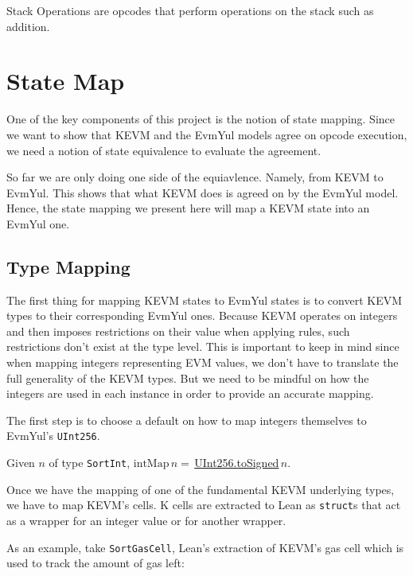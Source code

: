 Stack Operations are opcodes that perform operations on the stack such as addition.



\chapter{State Map}\label{chap:statemap}

One of the key components of this project is the notion of state mapping. Since
we want to show that KEVM and the EvmYul models agree on opcode execution, we
need a notion of state equivalence to evaluate the agreement.

So far we are only doing one side of the equiavlence. Namely, from KEVM to
EvmYul. This shows that what KEVM does is agreed on by the EvmYul model. Hence,
the state mapping we present here will map a KEVM state into an EvmYul one.

\section{Type Mapping}

The first thing for mapping KEVM states to EvmYul states is to convert KEVM
types to their corresponding EvmYul ones.
Because KEVM operates on integers and then imposes restrictions on their value
when applying rules, such restrictions don't exist at the type level. This is
important to keep in mind since when mapping integers representing EVM values,
we don't have to translate the full generality of the KEVM types. But we need to
be mindful on how the integers are used in each instance in order to provide an
accurate mapping.

The first step is to choose a default on how to map integers themselves to
EvmYul's \texttt{UInt256}.

\begin{definition}[intMap]\leanok\label{def:intMap}
Given $n$ of type \texttt{SortInt},
$\text{intMap}\, n =\,
$\href{https://runtimeverification.github.io/evm-equivalence/docs/EvmYul/UInt256.html#EvmYul.UInt256.toSigned}{UInt256.toSigned}$\,n$.
\end{definition}

Once we have the mapping of one of the fundamental KEVM underlying types, we
have to map KEVM's cells. K cells are extracted to Lean as \texttt{struct}s that
act as a wrapper for an integer value or for another wrapper.

As an example, take \texttt{SortGasCell},  Lean's extraction of KEVM's gas cell
which is used to track the amount of gas left:

